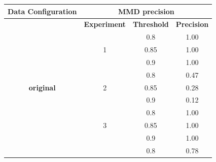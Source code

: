 \documentclass{mpaper}
\begin{document}
\begin{table}[]
\centering
\begin{tabular}{|c|ccc|}
\hline
\multicolumn{1}{|l|}{\textbf{Data Configuration}} & \multicolumn{3}{c|}{\textbf{MMD precision}}                                                                   \\ \hline
\multirow{13}{*}{\textbf{original}}               & \multicolumn{1}{c|}{\textbf{Experiment}}       & \multicolumn{1}{c|}{\textbf{Threshold}} & \textbf{Precision} \\ \cline{2-4} 
                                                  & \multicolumn{1}{c|}{}                          & \multicolumn{1}{c|}{0.8}                & 1.00               \\
                                                  & \multicolumn{1}{c|}{1}                         & \multicolumn{1}{c|}{0.85}               & 1.00               \\
                                                  & \multicolumn{1}{c|}{}                          & \multicolumn{1}{c|}{0.9}                & 1.00               \\ \cline{2-4} 
                                                  & \multicolumn{1}{c|}{}                          & \multicolumn{1}{c|}{0.8}                & 0.47               \\
                                                  & \multicolumn{1}{c|}{2}                         & \multicolumn{1}{c|}{0.85}               & 0.28               \\
                                                  & \multicolumn{1}{c|}{}                          & \multicolumn{1}{c|}{0.9}                & 0.12               \\ \cline{2-4} 
                                                  & \multicolumn{1}{c|}{}                          & \multicolumn{1}{c|}{0.8}                & 1.00               \\
                                                  & \multicolumn{1}{c|}{3}                         & \multicolumn{1}{c|}{0.85}               & 1.00               \\
                                                  & \multicolumn{1}{c|}{}                          & \multicolumn{1}{c|}{0.9}                & 1.00               \\ \cline{2-4} 
                                                  & \multicolumn{1}{c|}{}                          & \multicolumn{1}{c|}{0.8}                & 0.78               \\

\end{tabular}
\end{table}
\end{document}
